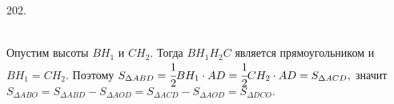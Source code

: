 202. \begin{figure}[ht!]
\end{figure}\\
Опустим высоты $BH_1$ и $CH_2.$ Тогда $BH_1H_2C$ является прямоугольником и $BH_1=CH_2.$ Поэтому $S_{\Delta ABD}=\cfrac{1}{2}BH_1\cdot AD=\cfrac{1}{2}CH_2\cdot AD=S_{\Delta ACD},$ значит $S_{\Delta ABO}=S_{\Delta ABD}-S_{\Delta AOD}=S_{\Delta ACD}-S_{\Delta AOD}=S_{\Delta DCO}.$\\
